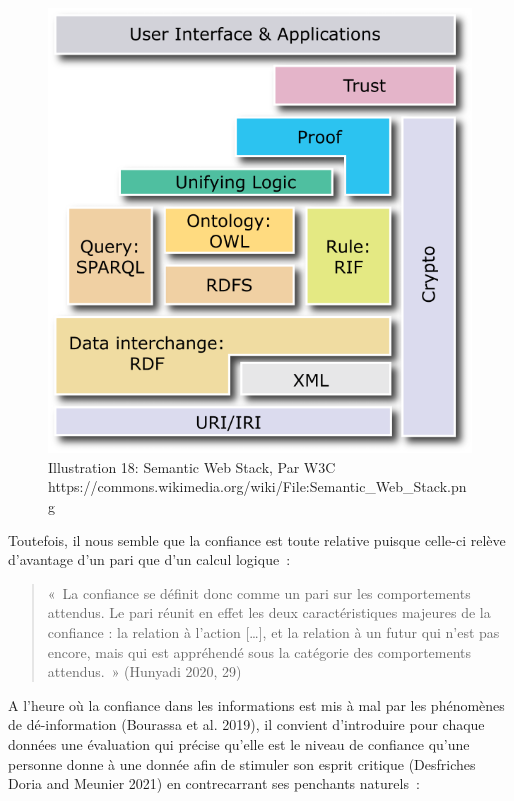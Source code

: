 \documentclass[
  letterpaper,
  DIV=11,
  numbers=noendperiod]{scrreprt}
\begin{document}
\begin{figure}

{\centering \includegraphics{media/1000000100000258000002762CF3B23905723B38.png}

}

\caption{\label{fig-semanticWebStack}Illustration 18: Semantic Web
Stack, Par W3C
https://commons.wikimedia.org/wiki/File:Semantic\_Web\_Stack.png}

\end{figure}

Toutefois, il nous semble que la confiance est toute relative puisque
celle-ci relève d'avantage d'un pari que d'un calcul logique~:

\begin{quote}
«~La confiance se définit donc comme un pari sur les comportements
attendus. Le pari réunit en effet les deux caractéristiques majeures de
la confiance : la relation à l'action {[}\ldots{]}, et la relation à un
futur qui n'est pas encore, mais qui est appréhendé sous la catégorie
des comportements attendus.~» (Hunyadi 2020, 29)
\end{quote}

A l'heure où la confiance dans les informations est mis à mal par les
phénomènes de dé-information (Bourassa et al. 2019), il convient
d'introduire pour chaque données une évaluation qui précise qu'elle est
le niveau de confiance qu'une personne donne à une donnée afin de
stimuler son esprit critique (Desfriches Doria and Meunier 2021) en
contrecarrant ses penchants naturels~:
\end{document}
